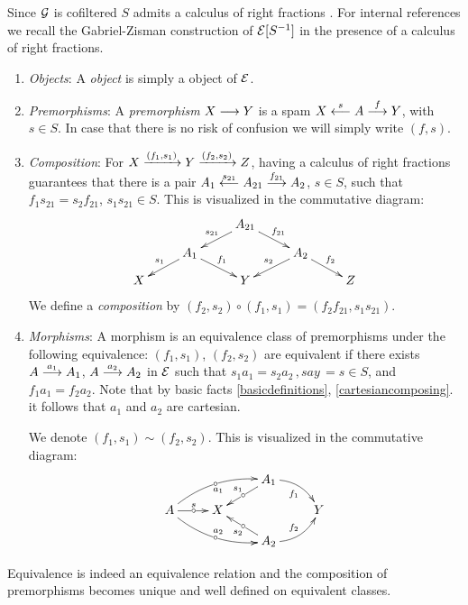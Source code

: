 \begin{definitionst} \label{gzfractions}
Since $\mathcal{G}$ is cofiltered $S$ admits a calculus of right fractions  \cite{sga4}. For internal references we recall the Gabriel-Zisman construction of  $\mathcal{E}[S^{-1}]$ in the presence of a calculus of right fractions. 

\begin{enumerate}

\item 
\emph{Objects}: A \emph{object} is simply a object of $\mathcal{E}$. 
 
\item
 \emph{Premorphisms}: 
 A \emph{premorphism} $X \overset {} {\longrightarrow} Y$ is a spam $X \overset {s} {\longleftarrow} A \overset {f} {\longrightarrow} Y$, with 
 $s \in S$. In case that there is no risk of confusion we will simply write $(f,s)$.
 
\item  \label{gzCompo}
\emph{Composition}: 
 For $X \xrightarrow{(f_1,s_1)} Y \xrightarrow{(f_2,s_2)} Z$, 
 having a calculus
of right fractions guarantees that there is a pair 
 $A_1 \overset {s_{21}} {\longleftarrow} A_{21} \overset {f_{21}} {\longrightarrow} A_2$, $s \in S$, such that
 $f_1 s_{21} = s_2 f_{21}$,  $s_1 s_{21} \in S$. This is visualized in the commutative diagram: 
$$
\xymatrix@R=2ex
    {
     && A_{21} \ar[dl]_{s_{21}} 
          \ar[dr]^{f_{21}} 
    \\
	  & A_1 \ar[dl]_{s_1}
	        \ar[dr]^{f_1} 
	 && A_2 \ar[dl]_{s_2} 
	        \ar[dr]^{f_2} 
	   & 
	  \\
		 X 
	  && Y 
	  && Z}
$$
We define a \emph{composition} by 
$(f_2, s_2) \circ (f_1, s_1) = (f_2 f_{21}, s_1 s_{21})$. 

\item \label{gzMorph}
\emph{Morphisms}: A morphism is an equivalence class of premorphisms under the following equivalence: 
$(f_1,s_1)$, $(f_2,s_2)$ are equivalent if there exists 
 $A \overset {a_1} {\longrightarrow} A_1$, $A \overset {a_2} {\longrightarrow} A_2$ in $\mathcal{E}$ such that 
 $s_1 a_1 = s_2 a_2 \,, say \, =  s  \in S$,  and $f_1 a_1 = f_2 a_2$. 
 Note that by basic facts \ref{basicdefinitions},  \ref{cartesiancomposing}. it follows that $a_1$ and $a_2$ are cartesian.
  
 We denote $(f_1,s_1) \sim (f_2,s_2)$. 
 This is visualized in the commutative diagram:
 $$
\xymatrix@R=2.5ex
      {
    && A_1 \ar@/^0.7pc/[dr]_{f_1}
           \ar[ld]_{s_1} | \car
    \\ 
       A \ar[r]^{s} | \car 
         \ar@/^0.8pc/[rru]_{a_1}   | \car
         \ar@/_0.8pc/[rrd]^{a_2}   | \car
     & X %
    && Y
    \\
    && A_2 \ar@/_0.7pc/[ur]^{f_2}
           \ar[ul]^{s_2} | \car           
       }
$$
\end{enumerate}
Equivalence is indeed an equivalence relation and the composition of premorphisms becomes unique and well defined on equivalent classes.


\end{definitionst}
